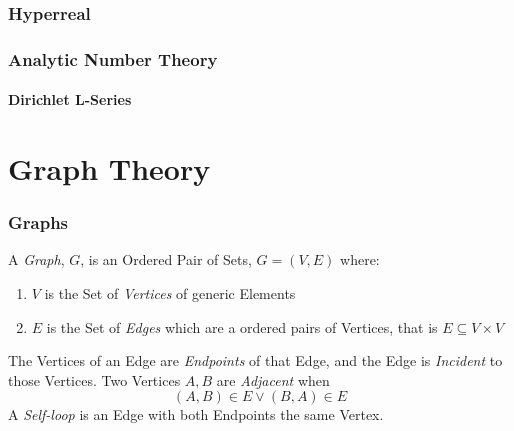 \documentclass{article}
\begin{document}
\section{Hyperreal}\label{sec:hyperreal}



\section{Analytic Number Theory}\label{sec:analytic_number_theory}
\subsection{Dirichlet L-Series}\label{subsec:l_series}



\part{Graph Theory}



\section{Graphs} \label{sec:graphs}

A \emph{Graph}, $G$, is an Ordered Pair of Sets, $G = (V,E)$ where:
\begin{enumerate}
\item $V$ is the Set of \emph{Vertices} of generic Elements
\item $E$ is the Set of \emph{Edges} which are a ordered pairs of
  Vertices, that is $E \subseteq V \times V$
\end{enumerate}
The Vertices of an Edge are \emph{Endpoints} of that Edge, and the
Edge is \emph{Incident} to those Vertices. Two Vertices $A,B$ are
\emph{Adjacent} when
\[
    (A,B) \in E \vee (B,A) \in E
\]
A \emph{Self-loop} is an Edge with both Endpoints the same Vertex.
\end{document}
